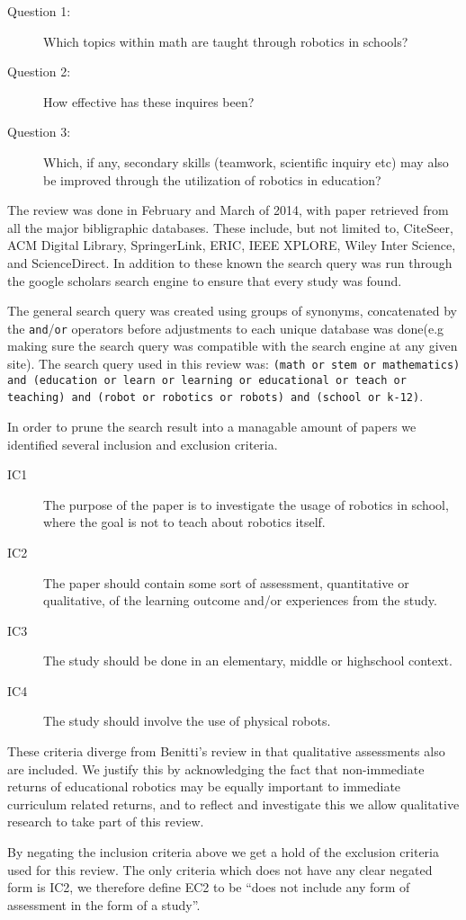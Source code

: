 \begin{description}
	\item[Question 1: ] Which topics within math are taught through robotics in schools?
	\item[Question 2: ] How effective has these inquires been?
	\item[Question 3: ] Which, if any, secondary skills (teamwork, scientific inquiry etc) may also be improved through the utilization of robotics in education?
\end{description}

\bigskip\noindent
The review was done in February and March of 2014, with paper retrieved from all the major bibligraphic databases. These include, but not limited to, CiteSeer, ACM Digital Library, SpringerLink, ERIC, IEEE XPLORE, Wiley Inter Science, and ScienceDirect. In addition to these known the search query was run through the 	google scholars search engine to ensure that every study was found.

\bigskip\noindent
The general search query was created using groups of synonyms, concatenated by the \texttt{and}/\texttt{or} operators before adjustments to each unique database was done(e.g making sure the search query was compatible with the search engine at any given site). The search query used in this review was: \texttt{(math or stem or mathematics) and (education or learn or learning or educational or teach or teaching) and (robot or robotics or robots) and (school or k-12)}. 

\bigskip\noindent
In order to prune the search result into a managable amount of papers we identified several inclusion and exclusion criteria. 
\begin{description}
	\item[IC1] The purpose of the paper is to investigate the usage of robotics in school, where the goal is not to teach about robotics itself.
	\item[IC2] The paper should contain some sort of assessment, quantitative or qualitative, of the learning outcome and/or experiences from the study. 
	\item[IC3] The study should be done in an elementary, middle or highschool context.
	\item[IC4] The study should involve the use of physical robots.
\end{description}
These criteria diverge from Benitti's review in that qualitative assessments also are included. 
We justify this by acknowledging the fact that non-immediate returns of educational robotics may be equally important to immediate curriculum related returns, 
and to reflect and investigate this we allow qualitative research to take part of this review. 	

\bigskip\noindent
By negating the inclusion criteria above we get a hold of the exclusion criteria used for this review. 
The only criteria which does not have any clear negated form is IC2, we therefore define EC2 to be "`does not include any form of assessment in the form of a study"'. 

